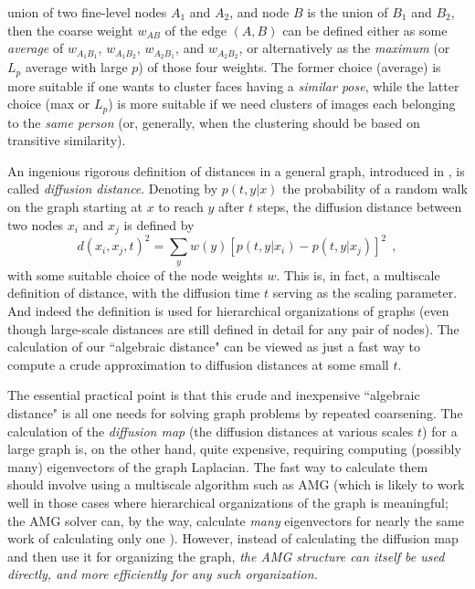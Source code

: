 \documentclass[final]{siamltex}
\begin{document}
\begin{itemize}
    union of  two fine-level nodes $A_1$ and $A_2$, and node
    $B$ is the union of $B_1$ and $B_2$, then the coarse weight
    $w_{AB}$ of the edge $(A,B)$ can be defined either as some
    {\it average} of $w_{A_1B_1}$, $w_{A_1B_2}$, $w_{A_2B_1}$, and
    $w_{A_2B_2}$, or alternatively as the {\it maximum} (or $L_p$
    average with large $p$) of those four weights. The former
    choice (average)  is more suitable if one wants to cluster
     faces having a {\it similar pose}, while the latter
    choice (max or $L_p$) is more suitable if we need clusters of
    images each belonging to the {\it same person} (or, generally,
    when the clustering should be based on transitive similarity).
\end{itemize}

An ingenious rigorous definition of distances in a general graph,
introduced in \cite{diffusion-maps}, is called {\it diffusion distance}. Denoting
by $p(t,y|x)$ the probability of a random walk on the graph
starting at $x$ to reach $y$ after $t$ steps, the diffusion
distance between two nodes $x_i$ and $x_j$ is defined by
\begin{equation}\label{diffusion}
d(x_i,x_j,t)^2 = \sum_y w(y)[p(t,y|x_i)-p(t,y|x_j)]^2~~,
\end{equation}
with some suitable choice of the node weights $w$. This is, in fact,
a multiscale definition of distance, with the diffusion time $t$
serving as the scaling parameter. And indeed the definition is
used for hierarchical organizations of graphs (even though
large-scale distances are still defined in detail for any pair of
nodes). The calculation of our ``algebraic distance" can be viewed
as just a fast way to compute a crude approximation to diffusion
distances at some small $t$.

The essential practical point is that this crude and inexpensive ``algebraic
distance" is all one needs for solving graph problems by repeated
coarsening. The calculation of the {\it diffusion map} (the diffusion
distances at various scales $t$) for a large graph is, on the other hand, quite expensive,
requiring computing (possibly many) eigenvectors of the graph Laplacian.
The fast way to calculate them should involve using a multiscale algorithm
such as AMG (which is likely to work well in those cases
where hierarchical organizations of the graph is meaningful; the
AMG solver can, by the way, calculate {\it many} eigenvectors for
nearly the same work of calculating only one \cite{Dan2}). However,
instead of calculating the diffusion map and then use it for
organizing the graph, {\it the AMG structure can itself be used directly,
and more efficiently for any such organization.}
\end{document}
